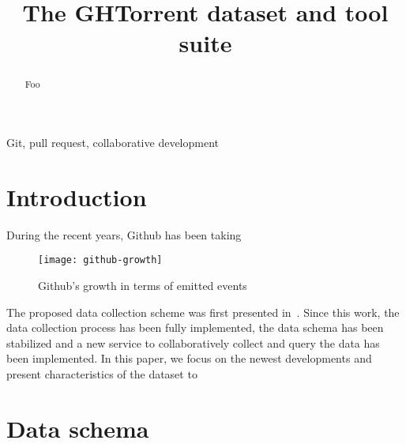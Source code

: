 \documentclass[conference]{IEEEtran}
\begin{document}
\title{The GHTorrent dataset and tool suite}

\author{ 
}

\maketitle

\begin{abstract}
Foo
\end{abstract}

\begin{IEEEkeywords}
Git, pull request, collaborative development
\end{IEEEkeywords}

\section{Introduction}
During the recent years, Github has been taking 

\begin{figure}
  \begin{center}
    \texttt{[image: github-growth]}
  \end{center}
  \caption{Github's growth in terms of emitted events}
  \label{fig:growth}
\end{figure}

The proposed data collection scheme was first presented in~\cite{GS12}.
Since this work, the data collection process has been fully
implemented, the data schema has been stabilized and a new service
to collaboratively collect and query the data has been implemented.
In this paper, we focus on the newest developments and present
characteristics of the dataset to 

\section{Data schema}
\end{document}
